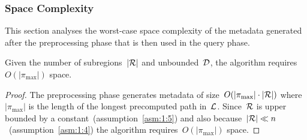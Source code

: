 \documentclass[a4paper]{report}
\begin{document}
%
%
%
\subsubsection{Space Complexity}
This section analyses the worst-case space complexity of the metadata generated after the preprocessing phase that is then used in the query phase.
\vspace{2mm}
\begin{lemma}
	Given the number of subregions~$|\mathcal{R}|$ and unbounded~$\mathcal{D}$, the algorithm requires~$O(|\pi_{\text{max}}|)$ space.
\end{lemma}
\begin{proof}
	The preprocessing phase generates metadata of size~$O(|\pi_{\text{max}}| \cdot |\mathcal{R}|)$ where $|\pi_{\text{max}}|$ is the length of the longest precomputed path in~$\mathcal{L}$. Since~$\mathcal{R}$ is upper bounded by a constant~(assumption~\ref{asm:1:5}) and also because~$|\mathcal{R}| \ll n$~(assumption~\ref{asm:1:4}) the algorithm requires~$O(|\pi_{\text{max}}|)$ space.
\end{proof}
\end{document}
